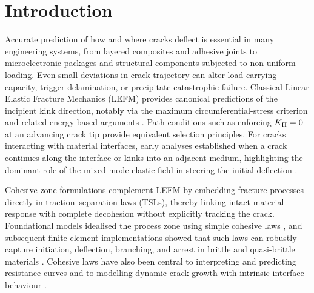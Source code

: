 \documentclass[smallextended]{svjour3}       %
\begin{document}

\section{Introduction}

Accurate prediction of how and where cracks deflect is essential in many
engineering systems, from layered composites and adhesive joints to
microelectronic packages and structural components subjected to non-uniform
loading. Even small deviations in crack trajectory can alter load-carrying
capacity, trigger delamination, or precipitate catastrophic failure.
Classical Linear Elastic Fracture Mechanics (LEFM) provides canonical
predictions of the incipient kink direction, notably via the maximum
circumferential-stress criterion and related energy-based arguments
\cite{ErdoganSih1963}. Path conditions such as enforcing
$K_{\rm II}=0$ at an advancing crack tip \cite{CotterellRice1980}
provide equivalent selection principles. For cracks interacting with
material interfaces, early analyses established when a crack continues
along the interface or kinks into an adjacent medium, highlighting the
dominant role of the mixed-mode elastic field in steering the initial
deflection \cite{HeHutchinson1989}.

Cohesive-zone formulations complement LEFM by embedding fracture processes
directly in traction--separation laws (TSLs), thereby linking intact
material response with complete decohesion without explicitly tracking the
crack. Foundational models idealised the process zone using simple cohesive
laws \cite{Barenblatt1962,Dugdale1960}, and subsequent finite-element
implementations showed that such laws can robustly capture initiation,
deflection, branching, and arrest in brittle and quasi-brittle materials
\cite{CamachoOrtiz1996}. Cohesive laws have also been central to
interpreting and predicting resistance curves
\cite{TvergaardHutchinson1992} and to modelling dynamic crack growth with
intrinsic interface behaviour \cite{XuNeedleman1994}.
\end{document}
